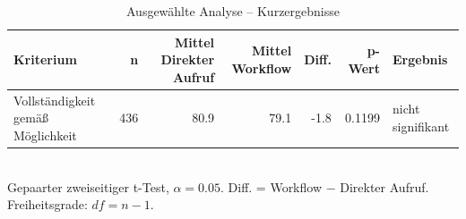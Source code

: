 \begin{table}[htbp]
\centering
\caption{Ausgewählte Analyse -- Kurzergebnisse}
\begin{tabular}{lrrrrrl}
\toprule
Kriterium & n & Mittel Direkter Aufruf & Mittel Workflow & Diff. & p-Wert & Ergebnis \\
\midrule
Vollständigkeit gemäß Möglichkeit & 436 & 80.9 & 79.1 & -1.8 & 0.1199 & nicht signifikant \\
\bottomrule
\end{tabular}
\\[2mm]
\footnotesize Gepaarter zweiseitiger t-Test, $\alpha=0.05$. Diff. = Workflow $-$ Direkter Aufruf. Freiheitsgrade: $df=n-1$.
\end{table}
